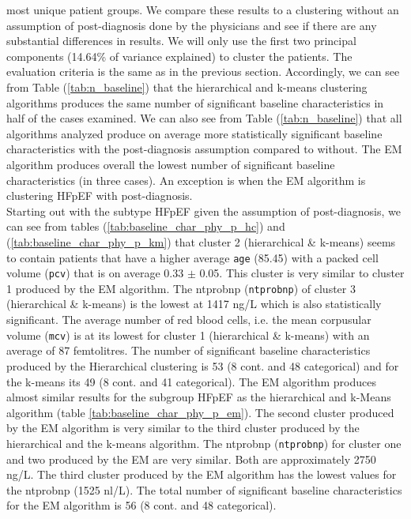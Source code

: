 \documentclass[../thesis.tex]{subfiles}
\begin{document}
\noindent most unique patient groups. We compare these results to a clustering without an assumption of post-diagnosis done by the physicians and see if there are any substantial differences in results. We will only use the first two principal components (14.64\% of variance explained) to cluster the patients. The evaluation criteria is the same as in the previous section. Accordingly, we can see from Table (\ref{tab:n_baseline}) that the hierarchical and k-means clustering algorithms produces the same number of significant baseline characteristics in half of the cases examined.  We can also see from Table (\ref{tab:n_baseline}) that all algorithms analyzed produce on average more statistically significant baseline characteristics with the post-diagnosis assumption compared to without. The EM algorithm produces overall the lowest number of significant baseline characteristics (in three cases). An exception is when the EM algorithm is clustering HFpEF with post-diagnosis.\\ 
\indent Starting out with the subtype HFpEF given the assumption of post-diagnosis, we can see from tables (\ref{tab:baseline_char_phy_p_hc}) and (\ref{tab:baseline_char_phy_p_km}) that cluster 2 (hierarchical \& k-means) seems to contain patients that have a higher average \texttt{age} (85.45) with a packed cell volume (\texttt{pcv}) that is on average 0.33 $\pm$ 0.05. This cluster is very similar to cluster 1 produced by the EM algorithm. The ntprobnp (\texttt{ntprobnp}) of cluster 3 (hierarchical \& k-means) is the lowest at 1417 ng/L which is also statistically significant. The average number of red blood cells, i.e. the mean corpusular volume (\texttt{mcv}) is at its lowest for cluster 1 (hierarchical \& k-means) with an average of 87 femtolitres. The number of significant baseline characteristics produced by the Hierarchical clustering is 53 (8 cont. and 48 categorical) and for the k-means its 49 (8 cont. and 41 categorical). The EM algorithm produces almost similar results for the subgroup HFpEF as the hierarchical and k-Means algorithm (table \ref{tab:baseline_char_phy_p_em}). The second cluster produced by the EM algorithm is very similar to the third cluster produced by the hierarchical and the k-means algorithm. The ntprobnp (\texttt{ntprobnp}) for cluster one and two produced by the EM are very similar. Both are approximately 2750 ng/L. The third cluster produced by the EM algorithm has the lowest values for the ntprobnp (1525 nl/L). The total number of significant baseline characteristics for the EM algorithm is 56 (8 cont. and 48 categorical). \\ 
\end{document}
